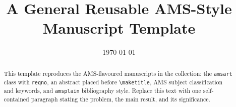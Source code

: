 \documentclass[11pt,reqno]{amsart}
\title[Short running title]{A General Reusable AMS-Style Manuscript Template}
\author{\NoCaseChange{[OI]}}
\date{\today}
\begin{document}
\begin{abstract}
This template reproduces the AMS-flavoured manuscripts in the
collection: the \texttt{amsart} class with \texttt{reqno}, an abstract
placed before \texttt{\textbackslash maketitle}, AMS subject
classification and keywords, and \texttt{amsplain} bibliography style.
Replace this text with one self-contained paragraph stating the
problem, the main result, and its significance.
\end{abstract}

\maketitle

\tableofcontents
\clearpage





\appendix




\end{document}
